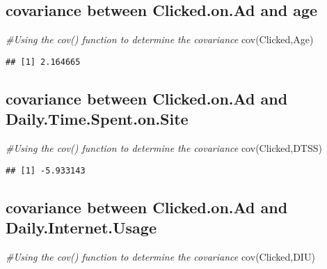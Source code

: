 \documentclass[
]{article}
\newenvironment{Shaded}{\begin{snugshade}}{\end{snugshade}}
\newcommand{\CommentTok}[1]{\textcolor[rgb]{0.56,0.35,0.01}{\textit{#1}}}
\newcommand{\FunctionTok}[1]{\textcolor[rgb]{0.00,0.00,0.00}{#1}}
\newcommand{\NormalTok}[1]{#1}
\begin{document}
\hypertarget{covariance-between-clicked.on.ad-and-age}{%
\subsection{covariance between Clicked.on.Ad and
age}\label{covariance-between-clicked.on.ad-and-age}}

\begin{Shaded}
\begin{Highlighting}[]
\CommentTok{\#Using the cov() function to determine the covariance}
\FunctionTok{cov}\NormalTok{(Clicked,Age)}
\end{Highlighting}
\end{Shaded}

\begin{verbatim}
## [1] 2.164665
\end{verbatim}

\hypertarget{covariance-between-clicked.on.ad-and-daily.time.spent.on.site}{%
\subsection{covariance between Clicked.on.Ad and
Daily.Time.Spent.on.Site}\label{covariance-between-clicked.on.ad-and-daily.time.spent.on.site}}

\begin{Shaded}
\begin{Highlighting}[]
\CommentTok{\#Using the cov() function to determine the covariance}
\FunctionTok{cov}\NormalTok{(Clicked,DTSS)}
\end{Highlighting}
\end{Shaded}

\begin{verbatim}
## [1] -5.933143
\end{verbatim}

\hypertarget{covariance-between-clicked.on.ad-and-daily.internet.usage}{%
\subsection{covariance between Clicked.on.Ad and
Daily.Internet.Usage}\label{covariance-between-clicked.on.ad-and-daily.internet.usage}}

\begin{Shaded}
\begin{Highlighting}[]
\CommentTok{\#Using the cov() function to determine the covariance}
\FunctionTok{cov}\NormalTok{(Clicked,DIU)}
\end{Highlighting}
\end{Shaded}
\end{document}
